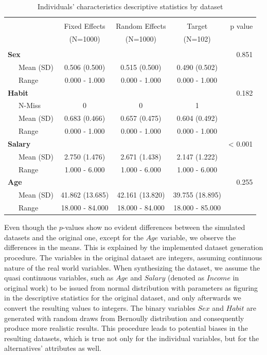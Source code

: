 \documentclass[12pt,]{article}
\begin{document}
\begin{table}[!htbp] \centering 
  \caption{Individuals' characteristics descriptive statistics by dataset} 
  \label{tab:indivdata} 
\begin{tabular}{@{\extracolsep{5pt}}lcccr}
\\[-1.8ex]\hline 
\hline \\[-1.8ex] 
 & Fixed Effects  & Random Effects  & Target  & p value\\
 & (N=1000) & (N=1000) & (N=102) &  \\
\hline \\[-1.8ex] 
\textbf{Sex} &  &  &  & 0.851\\
~~~Mean (SD) & 0.506 (0.500) & 0.515 (0.500) & 0.490 (0.502) & \\
~~~Range & 0.000 - 1.000 & 0.000 - 1.000 & 0.000 - 1.000 & \\
\textbf{Habit} &  &  &  & 0.182\\
~~~N-Miss & 0 & 0 & 1 & \\
~~~Mean (SD) & 0.683 (0.466) & 0.657 (0.475) & 0.604 (0.492) & \\
~~~Range & 0.000 - 1.000 & 0.000 - 1.000 & 0.000 - 1.000 & \\
\textbf{Salary} &  &  &  & < 0.001\\
~~~Mean (SD) & 2.750 (1.476) & 2.671 (1.438) & 2.147 (1.222) & \\
~~~Range & 1.000 - 6.000 & 1.000 - 6.000 & 1.000 - 6.000 & \\
\textbf{Age} &  &  &  & 0.255\\
~~~Mean (SD) & 41.862 (13.685) & 42.161 (13.820) & 39.755 (18.895) & \\
~~~Range & 18.000 - 84.000 & 18.000 - 84.000 & 18.000 - 85.000 & \\
\hline
\end{tabular}
\end{table}

Even though the \(p\)-values show no evident differences between the
simulated datasets and the original one, except for the \(Age\)
variable, we observe the differences in the means. This is explained by
the implemented dataset generation procedure. The variables in the
original dataset are integers, assuming continuous nature of the real
world variables. When synthesizing the dataset, we assume the quasi
continuous variables, such as \(Age\) and \(Salary\) (denoted as
\(Income\) in original work) to be issued from normal distribution with
parameters as figuring in the descriptive statistics for the original
dataset, and only afterwards we convert the resulting values to
integers. The binary variables \(Sex\) and \(Habit\) are generated with
random draws from Bernoully distribution and consequently produce more
realistic results. This procedure leads to potential biases in the
resulting datasets, which is true not only for the individual variables,
but for the alternatives' attributes as well.
\end{document}
